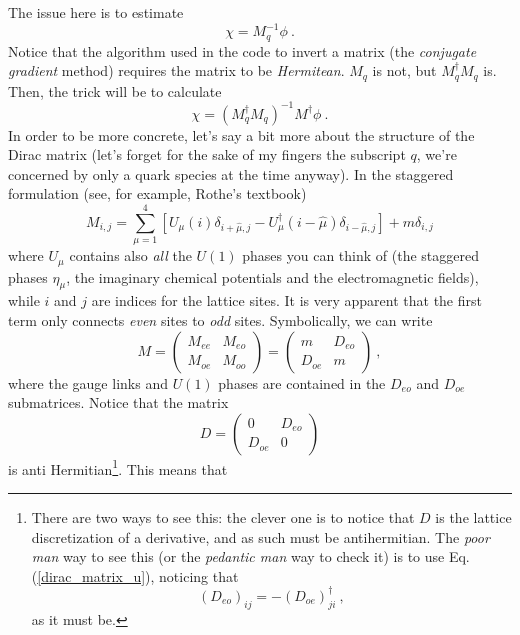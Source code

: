 \documentclass[a4paper,10pt]{article}
\begin{document}
The issue here is to estimate
\begin{equation}
 \label{problem}
 \chi = M_q^{-1} \phi \ . 
\end{equation}
Notice that the algorithm used in the code to invert a 
matrix (the \emph{conjugate gradient} method) requires the matrix to be 
\emph{Hermitean}. $M_q$ is not, but $M_q^\dagger M_q$ is. Then, the trick will 
be to calculate 
\begin{equation}
\label{trick}
 \chi = \left( M_q^\dagger M_q \right)^{-1} M^\dagger \phi \ . 
\end{equation}
In order to be more concrete, let's say a bit more about the structure of the 
Dirac matrix (let's forget for the sake of my fingers the subscript $q$, we're 
concerned by only a quark species at the time anyway). In the staggered 
formulation (see, for example, Rothe's textbook)
\begin{equation}
\label{dirac_matrix_u}
 M_{i,j} = \sum_{\mu = 1}^4 \left[ U_\mu(i) \delta_{i+\hat{\mu},j}- 
U_\mu^\dagger (i-\hat{\mu}) \delta_{i-\hat{\mu},j} \right] + m\delta_{i,j}
\end{equation}
where $U_\mu$ contains also \emph{all} the $U(1)$ phases you can think of 
(the staggered phases $\eta_\mu$, the imaginary chemical potentials and the 
electromagnetic fields), while $i$ and $j$ are indices for the lattice sites. 
It is very apparent that the first term only connects \emph{even} sites to 
\emph{odd} sites. Symbolically, we can write
\[ M = \left( \begin{array}{cc}
M_{ee} & M_{eo} \\
M_{oe} & M_{oo} 
\end{array}
\right) =
\left( \begin{array}{cc}
m & D_{eo} \\
D_{oe} & m 
\end{array}
\right) \ ,
\]
where the gauge links and $U(1)$ phases are contained in the $D_{eo}$ and 
$D_{oe}$ submatrices. Notice that the matrix  
\[ D = \left( \begin{array}{cc}
0 & D_{eo} \\
D_{oe} & 0 
\end{array}
\right)
\]
is anti Hermitian\footnote{There are two ways to see this: the clever one is to 
notice that $D$ is the lattice discretization of a derivative, and as such must 
be antihermitian. The \emph{poor man} way to see this (or the \emph{pedantic 
man} way to check it) is to use Eq.(\ref{dirac_matrix_u}), noticing that 
\begin{equation}
 \left(D_{eo}\right)_{ij} = - \left(D_{oe}\right)_{ji}^\dagger \ , 
\end{equation}
as it must be.
}. This means that 
\end{document}
